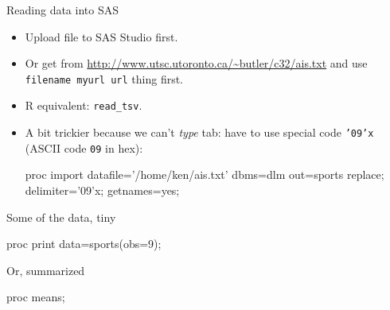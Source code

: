\documentclass[unknownkeysallowed]{beamer}\usepackage[]{graphicx}\usepackage[]{color}
\begin{document}
\begin{frame}[fragile]{Reading data into SAS}
  
  \begin{itemize}
    \item Upload file to SAS Studio first.
    \item Or get from
      \url{http://www.utsc.utoronto.ca/~butler/c32/ais.txt} and use
      \texttt{filename myurl url} thing first.
      
    \item R equivalent: \texttt{read\_tsv}.
  \item A bit trickier because we can't \emph{type} tab: have to use
    special code \texttt{'09'x} (ASCII code \texttt{09} in hex):
    
    \begin{Datastep}
proc import 
  datafile='/home/ken/ais.txt'
  dbms=dlm
  out=sports
  replace;
  delimiter='09'x;
  getnames=yes;

    \end{Datastep}
  \end{itemize}
  
\end{frame}

\begin{frame}[fragile]{Some of the data, tiny}
  
  \begin{Sascode}[store=ga]
proc print data=sports(obs=9);
  \end{Sascode}
  
  
\end{frame}

\begin{frame}[fragile]{Or, summarized}
  
  \begin{Sascode}[store=gb]
proc means;    
  \end{Sascode}
  
  
\end{frame}
\end{document}

